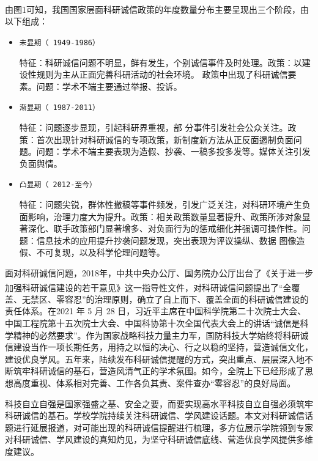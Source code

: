 \documentclass[12pt,hyperref,a4paper,UTF8]{ctexart}
\begin{document}
由图1可知，我国国家层面科研诚信政策的年度数量分布主要呈现出三个阶段\textsuperscript{\cite{GongHaoJiYuWenBenWaJueDeWoGuo20022021NianKeYanChengXinZhengCeBianQianTeZhengFenXi2022}}，由以下组成：
\begin{itemize}
    \item \texttt{未显期（
    1949-1986）} 
    
    特征：科研诚信问题不明显，鲜有发生，个别诚信事件及时处理。政策：以建设性规则为主从正面完善科研活动的社会环境。 政策中出现了科研诚信要素。问题：学术不端主要通过举报、投诉。

    \item \texttt{渐显期（
    1987-2011）} 
    
    特征：问题逐步显现，引起科研界重视，部
    分事件引发社会公众关注。政策：首次出现针对科研诚信的专项政策，新制度新方法从正反面遏制负面问题。问题：学术不端主要表现为造假、抄袭、一稿多投多发等。媒体关注引发负面舆情。

    \item \texttt{凸显期（
    2012-至今）} 
    
    特征：问题尖锐，群体性撤稿等事件频发，引发广泛关注，对科研环境产生负面影响，治理力度大为提升。政策：相关政策数量显著提升、政策所涉对象显著深化、联手政策部门显著增多、对负面行为的惩戒细化并强调可操作性。问题：信息技术的应用提升抄袭问题发现，突出表现为评议操纵、数据 图像造假、不可复现，以及科学伦理问题等。
 
\end{itemize}

面对科研诚信问题，2018年，中共中央办公厅、国务院办公厅出台了《关于进一步加强科研诚信建设的若干意见》\textsuperscript{\cite{ShiLuYanZhongGongZhongYangBanGongTingGuoWuYuanBanGongTingYinFaGuanYuJinYiBuJiaQiangKeYanChengXinJianSheDeRuoGanYiJian}}这一指导性文件，对科研诚信问题提出了“全覆盖、无禁区、零容忍”的治理原则，确立了自上而下、覆盖全面的科研诚信建设的责任体系。在2021 年 5 月 28 日，习近平主席在中国科学院第二十次院士大会、中国工程院第十五次院士大会、中国科协第十次全国代表大会上的讲话“诚信是科学精神的必然要求”。作为国家战略科技力量主力军，国防科技大学始终将科研诚信建设当作一项长期任务，用持之以恒的决心、行之以稳的坚持，营造诚信文化，建设优良学风。五年来，陆续发布科研诚信提醒的方式，突出重点、层层深入地不断筑牢科研诚信的基石，营造风清气正的学术氛围。如今，全院上下已经形成了思想高度重视、体系相对完善、工作各负其责、案件查办“零容忍”的良好局面。

科技自立自强是国家强盛之基、安全之要，而要实现高水平科技自立自强必须筑牢科研诚信的基石。学校学院持续关注科研诚信、学风建设话题。本文对科研诚信话题进行延展报道，对可能出现的科研诚信提醒进行梳理，多方位展示学院领到专家对科研诚信、学风建设的真知灼见，为坚守科研诚信底线、营造优良学风提供多维度建议。
\end{document}
